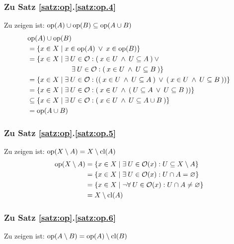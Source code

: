 \subsubsection{Zu Satz \ref{satz:op}.\ref{satz:op.4}}\label{anh:op.4}
    Zu zeigen ist: $\text{op}(A) \cup \text{op}(B) \subseteq \text{op}(A \cup B)$
    \begin{align*}
        &\text{op}(A) \cup \text{op}(B) \\
        &= \{x \in X \mid x \in \text{op}(A) \:\lor\: x \in \text{op}(B)\} \\
        &= \{x \in X \mid \exists\: U \in \mathcal{O} : (\: x \in U \:\land\: U \subseteq A \:) \:\lor\:\\
        &\hphantom{XXXXXXX} \exists\: U \in \mathcal{O} : (\: x \in U \:\land\: U \subseteq B \:) \} \\
        &= \{x \in X \mid \exists\: U \in \mathcal{O} : ((\: x \in U \:\land\: U \subseteq A \:) \:\lor\: (\: x \in U \:\land\: U \subseteq B \:)) \} \\
        &= \{x \in X \mid \exists\: U \in \mathcal{O} : (\: x \in U \:\land\: (\: U \subseteq A \:\lor\: U \subseteq B \:)) \} \\
        &\subseteq \{x \in X \mid \exists\: U \in \mathcal{O} : (\: x \in U \:\land\: U \subseteq A \cup B \:) \} \\
        &= \text{op}(A \cup B)
    \end{align*}
    
    
\subsubsection{Zu Satz \ref{satz:op}.\ref{satz:op.5}} 
    Zu zeigen ist: $\text{op}(X \setminus A) = X \setminus \text{cl}(A)$ \\
    \begin{align*}
        \text{op}(X \setminus A)
        &= \{x \in X \mid \exists\: U \in \mathcal{O}(x) : U \subseteq X \setminus A \}\\
        &= \{x \in X \mid \exists\: U \in \mathcal{O}(x) : U \cap A = \varnothing\}\\
        &= \{x \in X \mid \neg \forall\: U \in \mathcal{O}(x) : U \cap A \neq \varnothing \}\\
        &= X \setminus \text{cl}(A)
    \end{align*}


\subsubsection{Zu Satz \ref{satz:op}.\ref{satz:op.6}}\label{anh:op.5}	
    Zu zeigen ist: $\text{op}(A \setminus B) = \text{op}(A) \setminus \text{cl}(B)$\\


